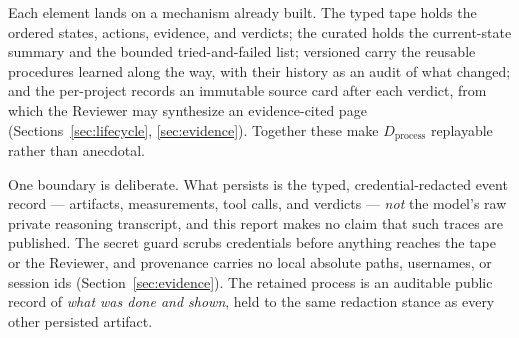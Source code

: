 Each element lands on a mechanism already built. The typed
 tape holds the ordered states, actions, evidence, and verdicts;
the curated  holds the current-state summary and the bounded
tried-and-failed list; versioned  carry the reusable procedures learned
along the way, with their history as an audit of what changed; and the per-project
 records an immutable source card after each verdict, from which the
Reviewer may synthesize an evidence-cited page (Sections~\ref{sec:lifecycle},
\ref{sec:evidence}). Together these make $D_{\mathrm{process}}$ replayable rather than
anecdotal.

One boundary is deliberate. What persists is the typed, credential-redacted event
record --- artifacts, measurements, tool calls, and verdicts --- \emph{not} the
model's raw private reasoning transcript, and this report makes no claim that such
traces are published. The secret guard scrubs credentials before anything reaches the
tape or the Reviewer, and provenance carries no local absolute paths, usernames, or
session ids (Section~\ref{sec:evidence}). The retained process is an auditable public
record of \emph{what was done and shown}, held to the same redaction stance as every
other persisted artifact.
